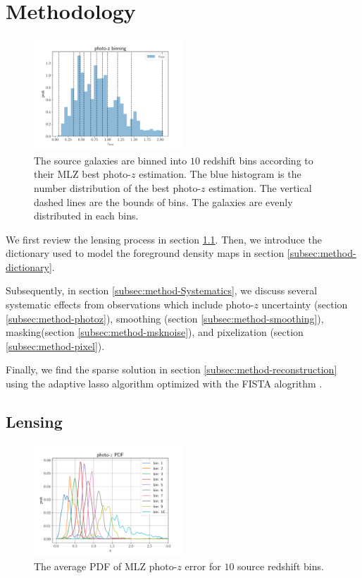 \documentclass[twocolumn]{aastex62}
\begin{document}
\section{Methodology}
\label{sec:Method}

\begin{figure}[!t]
 \centering
 \includegraphics[width=0.5\textwidth]{photo-z_binning.pdf}
 \caption{The source galaxies are binned into $10$ redshift bins according to their MLZ best photo-$z$ estimation.
        The blue histogram is the number distribution of the best photo-$z$ estimation. The vertical dashed lines
        are the bounds of bins. The galaxies are evenly distributed in each bins.} \label{fig-bestpz}
\end{figure}

We first review the lensing process in section \ref{subsec:method-delta2shear}.
Then, we introduce the dictionary used to model the foreground density maps in section \ref{subsec:method-dictionary}.

Subsequently, in section \ref{subsec:method-Systematics}, we discuss several systematic effects from observations which 
include photo-$z$ uncertainty (section \ref{subsec:method-photoz}),
smoothing (section \ref{subsec:method-smoothing}),
masking(section \ref{subsec:method-msknoise}),
and pixelization (section \ref{subsec:method-pixel}).

Finally, we find the sparse solution in section \ref{subsec:method-reconstruction} using the adaptive lasso algorithm 
\citep{AdaLASSO-Zou2006} optimized with the FISTA alogrithm \citep{FISTA-Beck2009}.


\subsection{Lensing}
\label{subsec:method-delta2shear}

\begin{figure}[!t]
 \centering
 \includegraphics[width=0.5\textwidth]{mlz-poz.pdf}
 \caption{The average PDF of MLZ photo-$z$ error for $10$ source redshift bins.}\label{fig-pdfpz}
\end{figure}
\end{document}
